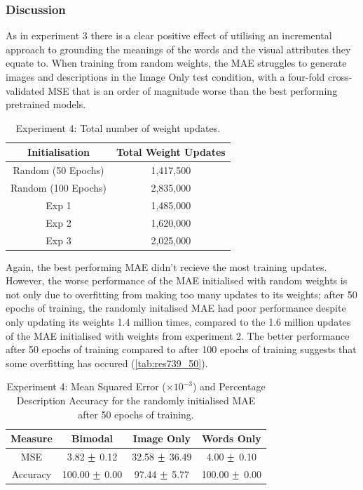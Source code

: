 \subsubsection{Discussion}
As in experiment 3 there is a clear positive effect of utilising an incremental approach to grounding the meanings of the words and the visual attributes they equate to. 
When training from random weights, the MAE struggles to generate images and descriptions in the Image Only test condition, with a four-fold cross-validated MSE that is an order of magnitude worse than the best performing pretrained models.

\begin{table}
\centering
\begin{tabular}{|c|c|}
\hline
\textbf{Initialisation} & \textbf{Total Weight Updates}\\ \hline
Random (50 Epochs) &  1,417,500\\ \hline
Random (100 Epochs) & 2,835,000\\ \hline
Exp 1 & 1,485,000\\ \hline
Exp 2 & 1,620,000\\ \hline
Exp 3 &	2,025,000\\ \hline

\end{tabular}
\caption{Experiment 4: Total number of weight updates.}
\label{tab:updatesTotal4}
\end{table}

Again, the best performing MAE didn't recieve the most training updates. However, the worse performance of the MAE initialised with random weights is not only due to overfitting from making too many updates to its weights; after 50 epochs of training, the randomly initalised MAE had poor performance despite only updating its weights 1.4 million times, compared to the 1.6 million updates of the MAE initialised with weights from experiment 2. The better performance after 50 epochs  of training compared to after 100 epochs of training suggests that some overfitting has occured (\autoref{tab:res739_50}).

\begin{table}[h!]
\centering
\begin{tabular}{|c|c|c|c|}
	\hline
	\textbf{Measure} & 	\textbf{Bimodal} & 	\textbf{Image Only} 	& 	\textbf{Words Only} \\ \hline
MSE	&	3.82	$\mypm$	0.12	&	32.58	$\mypm$	36.49	&	4.00	$\mypm$	0.10	\\ \hline
Accuracy	&	100.00	$\mypm$	0.00	&	97.44	$\mypm$	5.77	&	100.00	$\mypm$	0.00\\ \hline
\end{tabular}

\caption{Experiment 4: Mean Squared Error ($\times10^{-3}$) and Percentage Description Accuracy for the randomly initialised MAE after 50 epochs of training.} 
\label{tab:res739_50}
\end{table}


